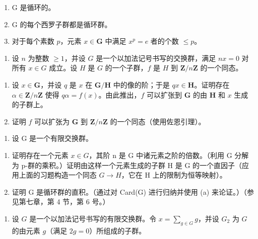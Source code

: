 \begin{enumerate}
\def\labelenumi{(\alph{enumi})}
\item
  G 是循环的。
\item
  G 的每个西罗子群都是循环群。
\item
  对于每个素数 \(p\)，元素 \(x \in \mathbf{G}\) 中满足 \(x^p = e\) 者的个数 \(\leqslant p\)。
\end{enumerate}

\begin{enumerate}
\def\labelenumi{\arabic{enumi}。}
\setcounter{enumi}{17}
\tightlist
\item
  设 \(n\) 为整数 \(\geqslant 1\)，并设 \(G\) 是一个以加法记号书写的交换群，满足 \(nx = 0\) 对所有 \(x \in G\) 成立。设 \(H\) 是 \(G\) 的一个子群，\(f\) 是 \(H\) 到 \(\mathbf{Z} / n\mathbf{Z}\) 的一个同态。
\end{enumerate}

\begin{enumerate}
\def\labelenumi{(\alph{enumi})}
\item
  设 \(x \in \mathbf{G}\)，并设 \(q\) 是 \(x\) 在 \(\mathbf{G} / \mathbf{H}\) 中的像的阶；于是 \(qx \in \mathbf{H}\)。证明存在 \(\alpha \in \mathbf{Z} / n\mathbf{Z}\) 使得 \(q\alpha = f(x)\)。由此推出，\(f\) 可以扩张到 \(\mathbf{G}\) 的由 \(\mathbf{H}\) 和 \(x\) 生成的子群上。
\item
  证明 \(f\) 可以扩张为 \(\mathbf{G}\) 到 \(\mathbf{Z} / n\mathbf{Z}\) 的一个同态（使用佐恩引理）。
\end{enumerate}

\begin{enumerate}
\def\labelenumi{\arabic{enumi}。}
\setcounter{enumi}{18}
\tightlist
\item
  设 G 是一个有限交换群。
\end{enumerate}

\begin{enumerate}
\def\labelenumi{(\alph{enumi})}
\item
  证明存在一个元素 \(x \in G\)，其阶 n 是 G 中诸元素之阶的倍数。（利用 G 分解为 p-群的乘积。）证明由这样一个元素生成的子群 H 是 G 的一个直因子（应用上面的习题构造一个同态 \(G \to H\)，它在 H 上的限制为恒等映射）。
\item
  证明 G 是循环群的直积。（通过对 Card(G) 进行归纳并使用 (a) 来论证。）（参见第七章，第 4 节，第 6 号。）
\end{enumerate}

\begin{enumerate}
\def\labelenumi{\arabic{enumi}。}
\setcounter{enumi}{19}
\tightlist
\item
  设 \(G\) 是一个以加法记号书写的有限交换群。令 \(x = \sum_{g \in G} g\)，并设 \(G_2\) 为 \(G\) 的由元素 \(g\)（满足 \(2g = 0\)）所组成的子群。
\end{enumerate}

